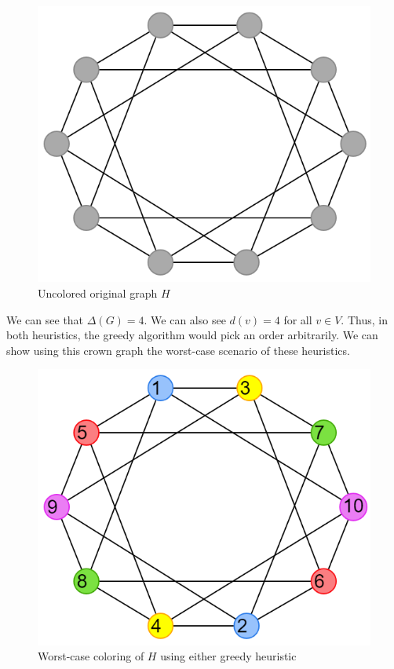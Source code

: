 \documentclass{article}
\begin{document}
\begin{figure}[H]
\centering
\includegraphics[scale=0.40]{graph-4.png}
\caption{Uncolored original graph \(H\)}
\end{figure}

We can see that \(\Delta(G) = 4\). We can also see \(d(v) = 4\) for all \(v \in V\). Thus, in both heuristics, the greedy algorithm would pick an order arbitrarily. We can show using this crown graph the worst-case scenario of these heuristics.

\begin{figure}[H]
\centering
\includegraphics[scale=0.40]{graph-5.png}
\caption{Worst-case coloring of \(H\) using either greedy heuristic}
\end{figure}
\end{document}
